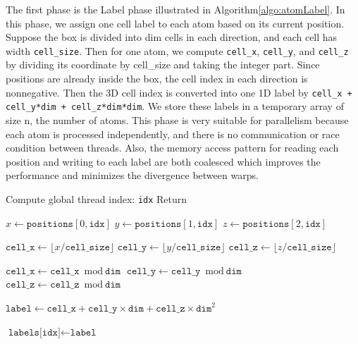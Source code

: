 \documentclass[12pt]{article}
\begin{document}
The first phase is the Label phase illustrated in Algorithm\ref{algo:atomLabel}. In this phase, we assign one cell label to each atom based on its current position. Suppose the box is divided into dim cells in each direction, and each cell has width \texttt{cell\_size}. Then for one atom, we compute \texttt{cell\_x}, \texttt{cell\_y}, and \texttt{cell\_z} by dividing its coordinate by cell\_size and taking the integer part. Since positions are already inside the box, the cell index in each direction is nonnegative. Then the 3D cell index is converted into one 1D label by \texttt{cell\_x + cell\_y*dim + cell\_z*dim*dim}. We store these labels in a temporary array of size n, the number of atoms. This phase is very suitable for parallelism because each atom is processed independently, and there is no communication or race condition between threads. Also, the memory access pattern for reading each position and writing to each label are both coalesced which improves the performance and minimizes the divergence between warps.

\begin{algorithm}[h]
\caption{Atom Label Kernel} \label{algo:atomLabel}
\begin{algorithmic}[1]

\State Compute global thread index: \texttt{idx}
    \State Return
\EndIf

\State 
\State $x \gets \texttt{positions}[0,\texttt{idx}]$
\State $y \gets \texttt{positions}[1,\texttt{idx}]$
\State $z \gets \texttt{positions}[2,\texttt{idx}]$

\State 
\State $\texttt{cell\_x} \gets \lfloor x / \texttt{cell\_size} \rfloor$
\State $\texttt{cell\_y} \gets \lfloor y / \texttt{cell\_size} \rfloor$
\State $\texttt{cell\_z} \gets \lfloor z / \texttt{cell\_size} \rfloor$

\State 
\State $\texttt{cell\_x} \gets \texttt{cell\_x} \bmod \texttt{dim}$
\State $\texttt{cell\_y} \gets \texttt{cell\_y} \bmod \texttt{dim}$
\State $\texttt{cell\_z} \gets \texttt{cell\_z} \bmod \texttt{dim}$

\State 
\State $\texttt{label} \gets \texttt{cell\_x} + \texttt{cell\_y} \times \texttt{dim} + \texttt{cell\_z} \times \texttt{dim}^2$

\State 
\State $\texttt{labels[idx]} \gets \texttt{label}$

\end{algorithmic}
\end{algorithm}
\end{document}
